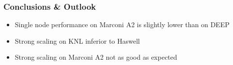 \documentclass{beamer}
\begin{document}

  \begin{frame}
    \frametitle{Conclusions \& Outlook}

    \begin{itemize}
      \item Single node performance on Marconi A2 is slightly lower than on DEEP
      \item Strong scaling on KNL inferior to Haswell
      \item Strong scaling on Marconi A2 not as good as expected
    \end{itemize}
  \end{frame}


  \begin{frame}
    \titlepage
  \end{frame}

  
\end{document}

